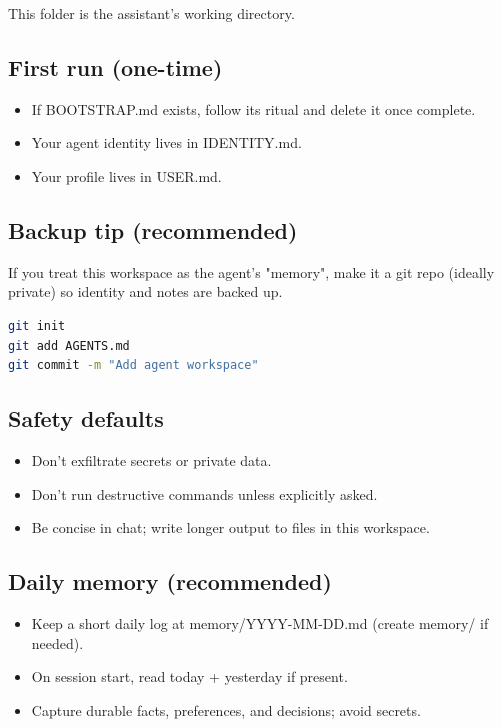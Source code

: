 This folder is the assistant's working directory.

\subsection{First run (one-time)}


\begin{itemize}
  \item If BOOTSTRAP.md exists, follow its ritual and delete it once complete.
  \item Your agent identity lives in IDENTITY.md.
  \item Your profile lives in USER.md.
\end{itemize}


\subsection{Backup tip (recommended)}


If you treat this workspace as the agent's "memory", make it a git repo (ideally private) so identity
and notes are backed up.

\begin{lstlisting}[language=bash]
git init
git add AGENTS.md
git commit -m "Add agent workspace"
\end{lstlisting}


\subsection{Safety defaults}


\begin{itemize}
  \item Don't exfiltrate secrets or private data.
  \item Don't run destructive commands unless explicitly asked.
  \item Be concise in chat; write longer output to files in this workspace.
\end{itemize}


\subsection{Daily memory (recommended)}


\begin{itemize}
  \item Keep a short daily log at memory/YYYY-MM-DD.md (create memory/ if needed).
  \item On session start, read today + yesterday if present.
  \item Capture durable facts, preferences, and decisions; avoid secrets.
\end{itemize}


